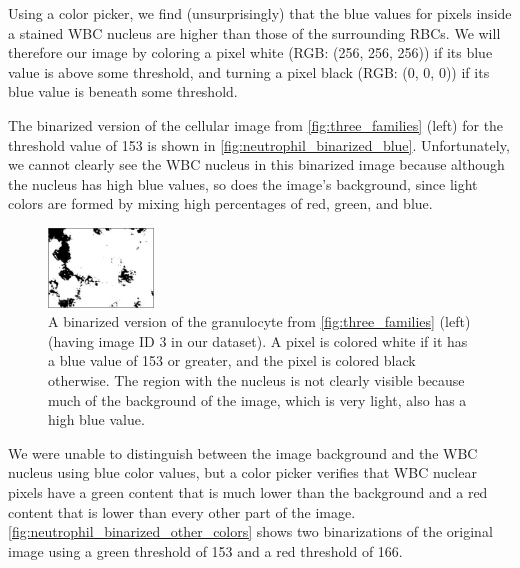 Using a color picker, we find (unsurprisingly) that the blue values for pixels inside a stained WBC nucleus are higher than those of the surrounding RBCs. We will therefore  our image by coloring a pixel white (RGB: (256, 256, 256)) if its blue value is above some threshold, and turning a pixel black (RGB: (0, 0, 0)) if its blue value is beneath some threshold.

The binarized version of the cellular image from \autoref{fig:three_families} (left) for the threshold value of 153 is shown in \autoref{fig:neutrophil_binarized_blue}. Unfortunately, we cannot clearly see the WBC nucleus in this binarized image because although the nucleus has high blue values, so does the image's background, since light colors are formed by mixing high percentages of red, green, and blue.

\begin{figure}[h]
\centering
\mySfFamily
\includegraphics[width = 0.25\textwidth]{../images/neutrophil_binarized_blue.png}
\caption{A binarized version of the granulocyte from \autoref{fig:three_families} (left) (having image ID 3 in our dataset). A pixel is colored white if it has a blue value of 153 or greater, and the pixel is colored black otherwise. The region with the nucleus is not clearly visible because much of the background of the image, which is very light, also has a high blue value.}
\label{fig:neutrophil_binarized_blue}
\end{figure}

\begin{qbox}\end{qbox}

We were unable to distinguish between the image background and the WBC nucleus using blue color values, but a color picker verifies that WBC nuclear pixels have a green content that is much lower than the background and a red content that is lower than every other part of the image. \autoref{fig:neutrophil_binarized_other_colors} shows two binarizations of the original image using a green threshold of 153 and a red threshold of 166.

